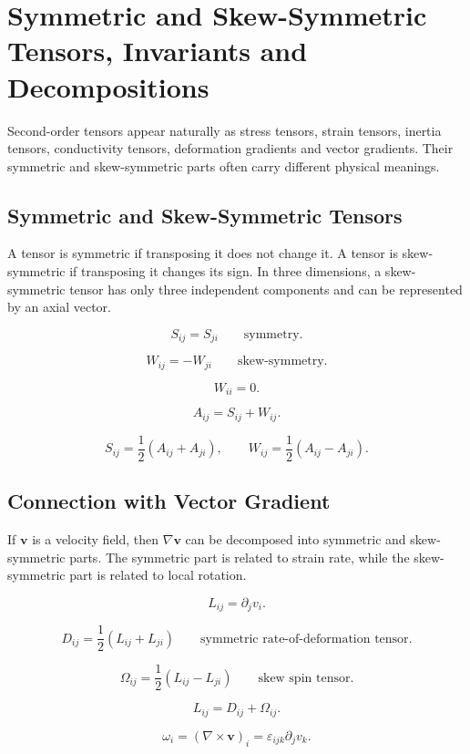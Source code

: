 \documentclass{otscience}
\begin{document}
\maketitle
\tableofcontents
\newpage
\fi

\section{Symmetric and Skew-Symmetric Tensors, Invariants and Decompositions}

Second-order tensors appear naturally as stress tensors, strain tensors, inertia tensors, conductivity tensors, deformation gradients and vector gradients. Their symmetric and skew-symmetric parts often carry different physical meanings.

\subsection{Symmetric and Skew-Symmetric Tensors}

A tensor is symmetric if transposing it does not change it. A tensor is skew-symmetric if transposing it changes its sign. In three dimensions, a skew-symmetric tensor has only three independent components and can be represented by an axial vector.

\begin{formulaboxnosplit}
    \[
        S_{ij}=S_{ji}\qquad\text{symmetry}.
    \]

    \[
        W_{ij}=-W_{ji}\qquad\text{skew-symmetry}.
    \]

    \[
        W_{ii}=0.
    \]

    \[
        A_{ij}=S_{ij}+W_{ij}.
    \]

    \[
        S_{ij}=\frac12(A_{ij}+A_{ji}),
        \qquad
        W_{ij}=\frac12(A_{ij}-A_{ji}).
    \]
\end{formulaboxnosplit}

\subsection{Connection with Vector Gradient}

If \(\mathbf{v}\) is a velocity field, then \(\nabla\mathbf{v}\) can be decomposed into symmetric and skew-symmetric parts. The symmetric part is related to strain rate, while the skew-symmetric part is related to local rotation.

\begin{formulabox}
    \[
        L_{ij}=\partial_{j}v_i.
    \]

    \[
        D_{ij}=\frac12(L_{ij}+L_{ji})
        \qquad\text{symmetric rate-of-deformation tensor}.
    \]

    \[
        \Omega_{ij}=\frac12(L_{ij}-L_{ji})
        \qquad\text{skew spin tensor}.
    \]

    \[
        L_{ij}=D_{ij}+\Omega_{ij}.
    \]

    \[
        \omega_i={(\nabla\times\mathbf{v})}_i=\varepsilon_{ijk}\partial_{j}v_k.
    \]
\end{formulabox}
\end{document}
